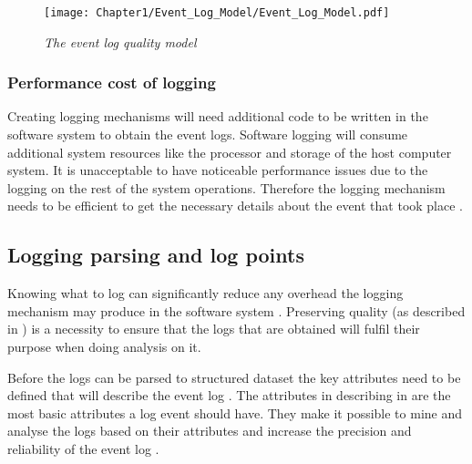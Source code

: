 \begin{figure}[!htb] %
	\centering %
	\texttt{[image: Chapter1/Event\_Log\_Model/Event\_Log\_Model.pdf]}
	\caption[The event log quality model]
	{\textit{The event log quality model \cite{Kherbouche2017}}} \label{fig:EventQModel}
\end{figure}

\subsubsection{Performance cost of logging} 
Creating logging mechanisms will need additional code to be written in the software system to obtain the event logs. Software logging will consume additional system resources like the processor and storage of the host computer system. It is unacceptable to have noticeable performance issues due to the logging on the rest of the system operations. Therefore the logging mechanism needs to be efficient to get the necessary details about the event that took place \cite{Zhu2015,Zhu2019}. 

\clearpage

\subsection{Logging parsing and log points}\label{sec:ch1_loggignPoints}
Knowing what to log can significantly reduce any overhead the logging mechanism may produce in the software system \cite{Jia2018, Pecchia2015}. Preserving quality (as described in ) is a necessity to ensure that the logs that are obtained will fulfil their purpose when doing analysis on it.\par Before the logs can be parsed to structured dataset the key attributes need to be defined that will describe the event log \cite{Bekeneva2020}. The attributes in describing in  are the most basic attributes a log event should have. They make it possible to mine and analyse the logs based on their attributes and increase the precision and reliability of the event log \cite{Kherbouche2017}.


